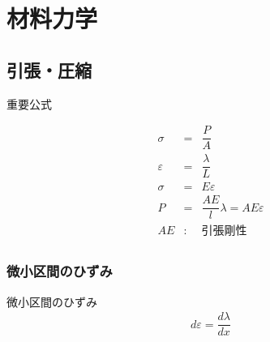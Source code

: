 \documentclass[a4paper]{jsarticle}
\begin{document}
\section{材料力学}
\subsection{引張・圧縮}
\begin{itembox}[l]{重要公式}
    \begin{center}
        \begin{eqnarray*}
            \sigma&=&\dfrac{P}{A}\\
            \varepsilon&=&\dfrac{\lambda}{L}\\
            \sigma&=&E\varepsilon\\
            P&=&\dfrac{AE}{l}\lambda=AE\varepsilon\\
            AE&:&引張剛性\\
        \end{eqnarray*}
    \end{center}
\end{itembox}
\subsubsection{微小区間のひずみ}
\begin{itembox}[l]{微小区間のひずみ}
    \begin{eqnarray*}
        d\varepsilon=\dfrac{d\lambda}{dx}\\
    \end{eqnarray*}
\end{itembox}
\end{document}
